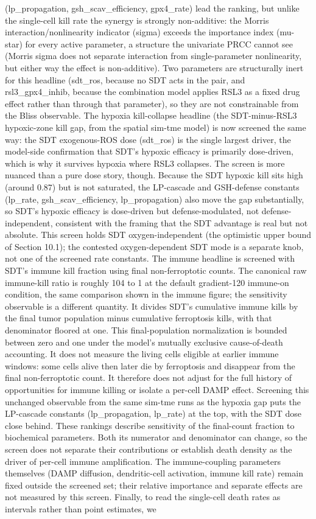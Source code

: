 \documentclass[11pt,twoside,openright]{report}
\begin{document}
\begin{enumerate}
(lp\_propagation, gsh\_scav\_efficiency, gpx4\_rate) lead the ranking, but unlike the single-cell kill rate the synergy is strongly non-additive: the Morris interaction/nonlinearity indicator (sigma) exceeds the importance index (mu-star) for every active parameter, a structure the univariate PRCC cannot see (Morris sigma does not separate interaction from single-parameter nonlinearity, but either way the effect is non-additive). Two parameters are structurally inert for this headline (sdt\_ros, because no SDT acts in the pair, and rsl3\_gpx4\_inhib, because the combination model applies RSL3 as a fixed drug effect rather than through that parameter), so they are not constrainable from the Bliss observable. The hypoxia kill-collapse headline (the SDT-minus-RSL3 hypoxic-zone kill gap, from the spatial sim-tme model) is now screened the same way: the SDT exogenous-ROS dose (sdt\_ros) is the single largest driver, the model-side confirmation that SDT's hypoxic efficacy is primarily dose-driven, which is why it survives hypoxia where RSL3 collapses. The screen is more nuanced than a pure dose story, though. Because the SDT hypoxic kill sits high (around 0.87) but is not saturated, the LP-cascade and GSH-defense constants (lp\_rate, gsh\_scav\_efficiency, lp\_propagation) also move the gap substantially, so SDT's hypoxic efficacy is dose-driven but defense-modulated, not defense-independent, consistent with the framing that the SDT advantage is real but not absolute. This screen holds SDT oxygen-independent (the optimistic upper bound of Section 10.1); the contested oxygen-dependent SDT mode is a separate knob, not one of the screened rate constants. The immune headline is screened with SDT's immune kill fraction using final non-ferroptotic counts. The canonical raw immune-kill ratio is roughly 104 to 1 at the default gradient-120 immune-on condition, the same comparison shown in the immune figure; the sensitivity observable is a different quantity. It divides SDT's cumulative immune kills by the final tumor population minus cumulative ferroptosis kills, with that denominator floored at one. This final-population normalization is bounded between zero and one under the model's mutually exclusive cause-of-death accounting. It does not measure the living cells eligible at earlier immune windows: some cells alive then later die by ferroptosis and disappear from the final non-ferroptotic count. It therefore does not adjust for the full history of opportunities for immune killing or isolate a per-cell DAMP effect. Screening this unchanged observable from the same sim-tme runs as the hypoxia gap puts the LP-cascade constants (lp\_propagation, lp\_rate) at the top, with the SDT dose close behind. These rankings describe sensitivity of the final-count fraction to biochemical parameters. Both its numerator and denominator can change, so the screen does not separate their contributions or establish death density as the driver of per-cell immune amplification. The immune-coupling parameters themselves (DAMP diffusion, dendritic-cell activation, immune kill rate) remain fixed outside the screened set; their relative importance and separate effects are not measured by this screen. Finally, to read the single-cell death rates as intervals rather than point estimates, we 
\end{enumerate}
\end{document}
